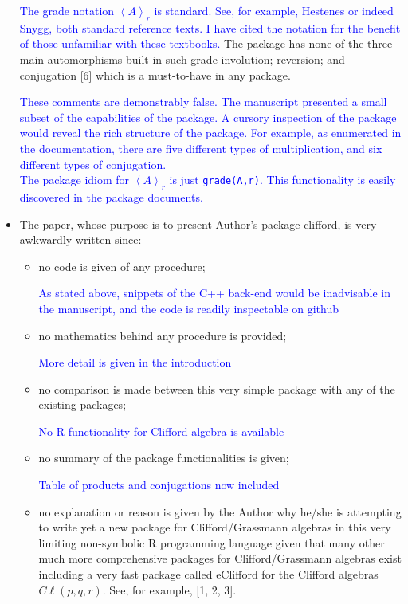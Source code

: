 \documentclass{article}
\newcommand{\cliff}[1]{\ensuremath{C\ell\left(#1\right)}}
\begin{document}
\begin{itemize}
{  \textcolor{blue}{The grade notation $\left\langle A\right\rangle_r$
    is standard.  See, for example, Hestenes or indeed Snygg, both
    standard reference texts.  I have cited the notation for the
    benefit of those unfamiliar with these textbooks.}}
 The package has none
  of the three main automorphisms built-in such grade involution;
  reversion; and conjugation [6] which is a must-to-have in any
  package.

\textcolor{blue}{These comments are demonstrably false.  The
  manuscript presented a small subset of the capabilities of the
  package.  A cursory inspection of the package would reveal the rich
  structure of the package.  For example, as enumerated in the
  documentation, there are five different types of multiplication, and
  six different types of conjugation.\\ The package idiom for
  $\left\langle A\right\rangle_r$ is just {\tt grade(A,r)}. This
  functionality is easily discovered in the package documents.  }

\item The paper, whose purpose is to present Author’s package clifford, is very awkwardly written
since:

\begin{itemize}
\item no code is given of any procedure;

  \textcolor{blue}{As stated above, snippets of the C++ back-end would
    be inadvisable in the manuscript, and the code is readily
    inspectable on github}
\item  no mathematics behind any procedure is provided;

  \textcolor{blue}{More detail is given in the introduction}
\item no comparison is made between this very simple package with any of the existing packages;

  \textcolor{blue}{No R functionality for Clifford algebra is available}

\item  no summary of the package functionalities is given;

    \textcolor{blue}{Table of products and conjugations now included}

\item  no explanation or reason is given by the Author why he/she is attempting to write yet
a new package for Clifford/Grassmann algebras in this very limiting non-symbolic R
programming language given that many other much more comprehensive packages for
Clifford/Grassmann algebras exist including a very fast package called eClifford for
the Clifford algebras \cliff{p, q, r}. See, for example, [1, 2, 3].


\end{itemize}
\end{itemize}
\end{document}
